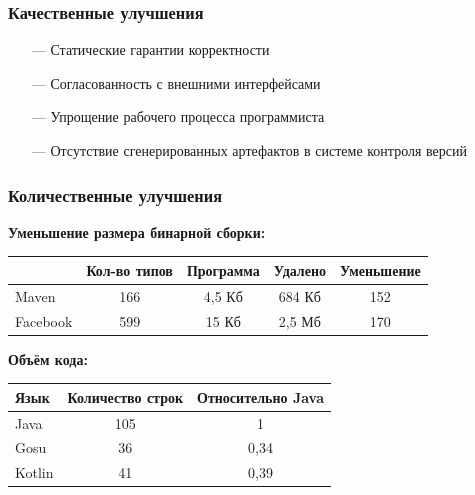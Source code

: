 \documentclass[12pt]{beamer}
\begin{document}
\begin{frame}\frametitle{Качественные улучшения}
\linespread{1.1}
\begin{Large}
    \begin{itemize}
        \item[---] Статические гарантии корректности
        \item[---] Согласованность с внешними интерфейсами
        \item[---] Упрощение рабочего процесса программиста
        \item[---] Отсутствие сгенерированных артефактов в системе контроля версий
    \end{itemize}
\end{Large}
\linespread{1}
\end{frame}

\begin{frame}\frametitle{Количественные улучшения}
\begin{small}
\textbf{Уменьшение размера бинарной сборки:}
\begin{table}[!h]
    \begin{tabular}{ | l | c | c | c | c | }
    \hline
               & Кол-во типов & Программа & Удалено & Уменьшение \\ \hline
    Maven      & 166   & 4,5 Кб  & 684 Кб & 152 \\ \hline
    Facebook   & 599   & 15 Кб  & 2,5 Мб & 170 \\ \hline
    \end{tabular}
\end{table}


\textbf{Объём кода:}
\begin{table}[!h]
    \begin{tabular}{ | l | c | c | }
    \hline
    Язык    & Количество строк & Относительно Java \\ \hline
    Java    & 105   & 1 \\ \hline
    Gosu    & 36    & 0,34  \\ \hline
    Kotlin  & 41    & 0,39 \\
    \hline
    \end{tabular}
\end{table}

\end{small}
\end{frame}
\end{document}
